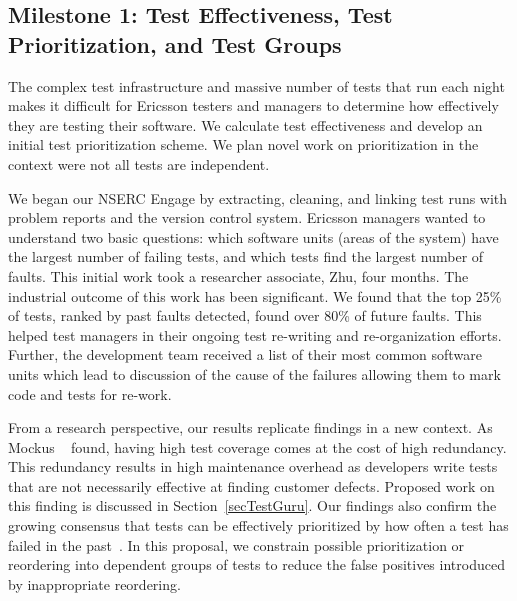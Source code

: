 \subsection{Milestone 1: Test Effectiveness, Test Prioritization, and Test Groups}

The complex test infrastructure and massive number of tests that run each night makes it difficult for Ericsson testers and managers to determine how effectively they are testing their software. We calculate test effectiveness and develop an initial test prioritization scheme. We plan novel work on prioritization in the context were not all tests are independent.

We began our NSERC Engage by extracting, cleaning, and linking test runs with problem reports and the version control system. Ericsson managers wanted to understand two basic questions: which software units (areas of the system) have the largest number of failing tests, and which tests find the largest number of faults. 
%
This initial work took a researcher associate, Zhu, four months. The industrial outcome of this work has been significant. We found that the top 25\% of tests, ranked by past faults detected, found over 80\% of future faults.
%
%
This helped test managers in their ongoing test re-writing and re-organization efforts. Further, the development team received a list of their most common software units which lead to discussion of the cause of the failures allowing them to mark code and tests for re-work. 

From a research perspective, our results replicate findings in a new context. As Mockus \etal~\cite{Mockus2009ESEM} found, having high test coverage comes at the cost of high redundancy. This redundancy results in high maintenance overhead as developers write tests that are not necessarily effective at finding customer defects. Proposed work on this finding is discussed in Section~\ref{secTestGuru}. Our findings also confirm the growing consensus that tests can be effectively prioritized by how often a test has failed in the past~\cite{Kim2002ICSE,Hemmati}. In this proposal, we constrain possible prioritization or reordering into dependent groups of tests to reduce the false positives introduced by inappropriate reordering.


